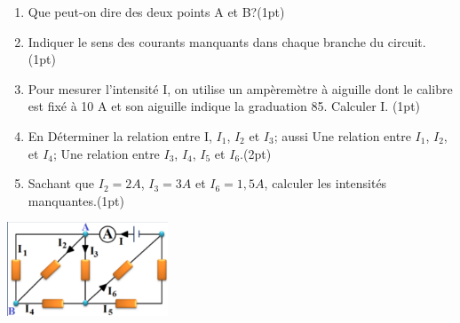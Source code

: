 \documentclass[12pt]{article}
\begin{document}
\begin{enumerate}
    \item Que peut-on dire des deux points A et B?\dotfill(1pt)
    \item Indiquer le sens des courants manquants
dans chaque branche du circuit. \dotfill(1pt)
                \item Pour mesurer l’intensité I, on utilise un ampèremètre à aiguille dont le calibre est fixé à 10 A et son aiguille indique la graduation 85. Calculer I.  \dotfill(1pt)
                \item En Déterminer la  relation entre I, $I_1$, $I_2$ et $I_3$; aussi Une relation entre $I_1$, $I_2$, et $I_4$; Une relation entre $I_3$, $I_4$, $I_5$ et $I_6$.\dotfill(2pt) 
    \item Sachant que $I_2 = 2 A$, $I_3 = 3 A$ et $I_6 = 1,5 A$, calculer les intensités manquantes.\dotfill(1pt)

\end{enumerate}
\begin{center}

    \includegraphics[width=0.36\textwidth]{./img/exo_00.png}
\end{center}
\end{document}
